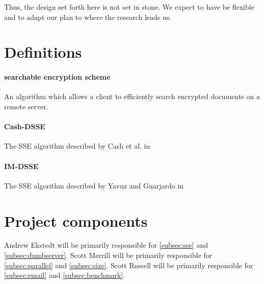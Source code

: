\documentclass[onecolumn, draftclsnofoot,10pt, compsoc]{IEEEtran}
\begin{document}
Thus, the design set forth here is not set in stone.
We expect to have be flexible and to adapt our plan to where the research leads us. 



\section{ Definitions }

\paragraph*{\textbf{searchable encryption scheme}} An algorithm which allows a client to efficiently search encrypted documents on a remote server.

\paragraph*{\textbf{Cash-DSSE}} The SSE algorithm described by Cash et al. in \cite{cash14}

\paragraph*{\textbf{IM-DSSE}} The SSE algorithm described by Yavuz and Guarjardo in \cite{yavuz15}




\section{ Project components }





Andrew Ekstedt will be primarily responsible for \ref{subsec:sse} and \ref{subsec:dumbserver}.
Scott Merrill will be primarily responsible for \ref{subsec:parallel} and \ref{subsec:size}.
Scott Russell will be primarily responsible for \ref{subsec:email} and \ref{subsec:benchmark}.
\end{document}
